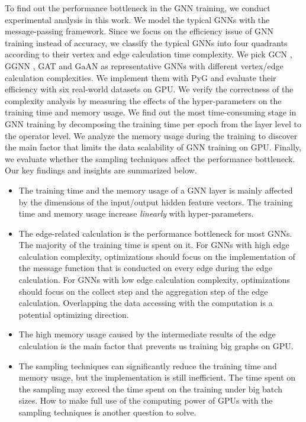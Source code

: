 To find out the performance bottleneck in the GNN training, we conduct experimental analysis in this work.
We model the typical GNNs with the message-passing framework.
Since we focus on the efficiency issue of GNN training instead of accuracy, we classify the typical GNNs into four quadrants according to their vertex and edge calculation time complexity.
We pick GCN \cite{kipf2017_gcn}, GGNN \cite{li2015_ggnn}, GAT \cite{huang2018_gat} and GaAN \cite{zhang2018_gaan} as representative GNNs with different vertex/edge calculation complexities.
We implement them with PyG and evaluate their efficiency with six real-world datasets on GPU.
We verify the correctness of the complexity analysis by measuring the effects of the hyper-parameters on the training time and memory usage.
We find out the most time-consuming stage in GNN training by decomposing the training time per epoch from the layer level to the operator level.
We analyze the memory usage during the training to discover the main factor that limits the data scalability of GNN training on GPU.
Finally, we evaluate whether the sampling techniques affect the performance bottleneck.
Our key findings and insights are summarized below.

\begin{itemize}
    \item The training time and the memory usage of a GNN layer is mainly affected by the dimensions of the input/output hidden feature vectors.
          The training time and memory usage increase \emph{linearly} with hyper-parameters.
    \item The edge-related calculation is the performance bottleneck for most GNNs.
          The majority of the training time is spent on it.
          For GNNs with high edge calculation complexity, optimizations should focus on the implementation of the message function that is conducted on every edge during the edge calculation.
          For GNNs with low edge calculation complexity, optimizations should focus on the collect step and the aggregation step of the edge calculation.
          Overlapping the data accessing with the computation is a potential optimizing direction.
    \item The high memory usage caused by the intermediate results of the edge calculation is the main factor that prevents us training big graphs on GPU.
    \item The sampling techniques can significantly reduce the training time and memory usage, but the implementation is still inefficient. The time spent on the sampling may exceed the time spent on the training under big batch sizes. How to make full use of the computing power of GPUs with the sampling techniques is another question to solve.
\end{itemize}


